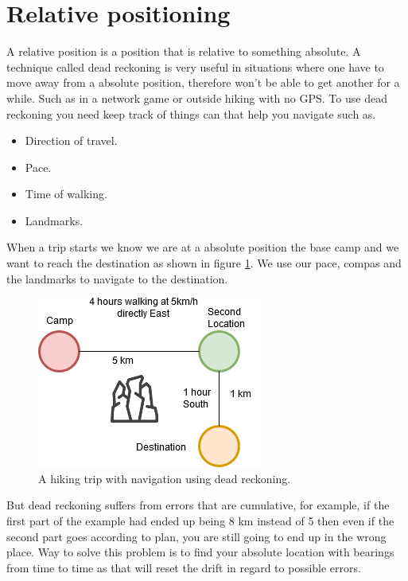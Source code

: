 \section{Relative positioning}
A relative position is a position that is relative to something absolute. A technique called dead reckoning is very useful in situations where one have to move away from a absolute position, therefore won't be able to get another for a while. Such as in a network game or outside hiking with no GPS. To use dead reckoning you need keep track of things can that help you navigate such as. 
\begin{itemize}
\item Direction of travel.
\item Pace.
\item Time of walking.
\item Landmarks.
\end{itemize}
When a trip starts we know we are at a absolute position the base camp and we want to reach the destination as shown in figure \ref{fig:deadrecdrawing}. We use our pace, compas and the landmarks to navigate to the destination.
\begin{figure}[H]
	\includegraphics[width=0.4\linewidth]{positioning/positioning/deadRecDrawing}
	\caption{A hiking trip with navigation using dead reckoning.}
	\label{fig:deadrecdrawing}
\end{figure}
But dead reckoning suffers from errors that are cumulative, for example, if the first part of the example had ended up being 8 km instead of 5 then even if the second part goes according to plan, you are still going to end up in the wrong place. Way to solve this problem is to find your absolute location with bearings from time to time as that will reset the drift in regard to possible errors.